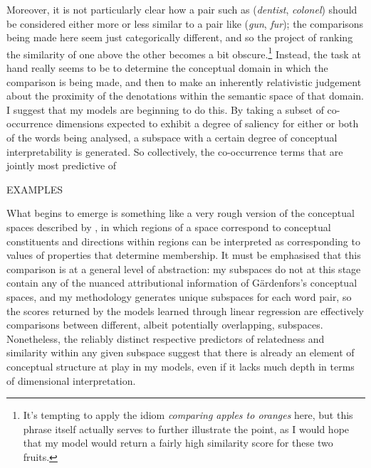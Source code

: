 Moreover, it is not particularly clear how a pair such as (\emph{dentist}, \emph{colonel}) should be considered either more or less similar to a pair like (\emph{gun}, \emph{fur}); the comparisons being made here seem just categorically different, and so the project of ranking the similarity of one above the other becomes a bit obscure.\footnote{It's tempting to apply the idiom \emph{comparing apples to oranges} here, but this phrase itself actually serves to further illustrate the point, as I would hope that my model would return a fairly high similarity score for these two fruits.}  Instead, the task at hand really seems to be to determine the conceptual domain in which the comparison is being made, and then to make an inherently relativistic judgement about the proximity of the denotations within the semantic space of that domain.  I suggest that my models are beginning to do this.  By taking a subset of co-occurrence dimensions expected to exhibit a degree of saliency for either or both of the words being analysed, a subspace with a certain degree of conceptual interpretability is generated.  So collectively, the co-occurrence terms that are jointly most predictive of 

EXAMPLES

What begins to emerge is something like a very rough version of the conceptual spaces described by \cite{Gardenfors2000}, in which regions of a space correspond to conceptual constituents and directions within regions can be interpreted as corresponding to values of properties that determine membership.  It must be emphasised that this comparison is at a general level of abstraction: my subspaces do not at this stage contain any of the nuanced attributional information of G\"{a}rdenfors's conceptual spaces, and my methodology generates unique subspaces for each word pair, so the scores returned by the models learned through linear regression are effectively comparisons between different, albeit potentially overlapping, subspaces.  Nonetheless, the reliably distinct respective predictors of relatedness and similarity within any given subspace suggest that there is already an element of conceptual structure at play in my models, even if it lacks much depth in terms of dimensional interpretation.

